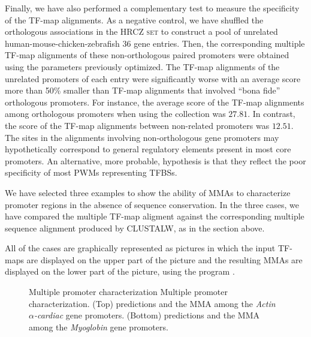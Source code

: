 Finally, we have also performed a complementary test to measure the 
specificity of the TF-map alignments. As a negative control, we have shuffled 
the orthologous associations in the \textsc{HRCZ set} to construct a pool of 
unrelated human-mouse-chicken-zebrafish $36$ gene entries. Then, the 
corresponding multiple TF-map alignments of these non-orthologous paired
promoters were obtained using the parameters previously optimized.
The TF-map alignments of the unrelated promoters of each entry were 
significantly worse with an average score more than 50\% smaller than 
TF-map alignments that involved ``bona fide'' orthologous promoters. 
For instance, the average score of the TF-map alignments among orthologous 
promoters when using the  collection was $27.81$. In contrast, 
the score of the TF-map alignments between non-related promoters was $12.51$. 
The sites in the alignments involving non-orthologous gene promoters may 
hypothetically correspond to general regulatory elements present 
in most core promoters. An alternative, more probable, hypothesis is that they
reflect the poor specificity of most PWMs representing TFBSs.


We have selected three examples to show the ability of MMAs to characterize
promoter regions in the absence of sequence conservation. In the three cases, 
we have compared the multiple TF-map aligment against the corresponding multiple 
sequence alignment produced by CLUSTALW, as in the section above. 

All of the cases are graphically represented as pictures in which the
input TF-maps are displayed on the upper part of the picture and the
resulting MMAs are displayed on the lower part of the picture, using the
 program \citep{abril:2000a}.

\begin{figure}[t!]
\begin{center}
\setlength{\fboxsep}{0pt}
          {Multiple promoter characterization}%
          {Multiple promoter characterization.}%
          {(Top)  predictions and the MMA among the \emph{Actin $\alpha$-cardiac} 
           gene promoters. 
           (Bottom)  predictions and the MMA among the \emph{Myoglobin} gene promoters.}
\end{center}
\end{figure}

